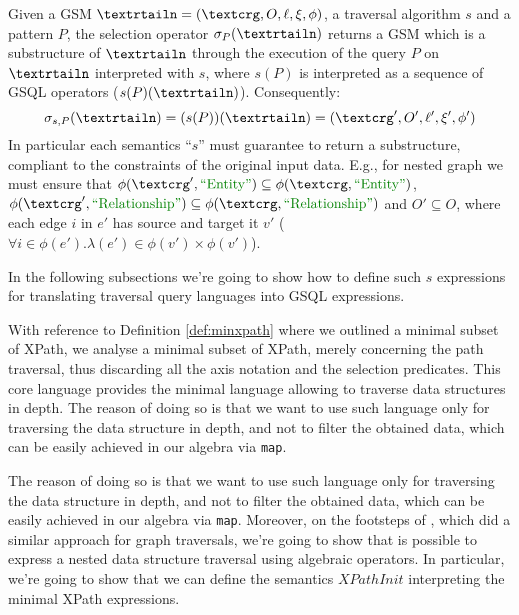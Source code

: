 \begin{definition}[Selection]
	Given a GSM $\fullnested$, a traversal algorithm $s$ and a pattern  $P$, the selection operator $\sigma_P(\nested)$ returns a GSM which is a substructure of $\nested$ through the execution of the query $P$ on $\nested$ interpreted with $s$, where $s(P)$ is interpreted as a sequence of GSQL operators ($s(P)(\nested)$). Consequently:
	\[\sigma_{s,P}(\nested)=(s(P))(\nested)=(\ngraph',O',\ell',\xi',\phi')\]
	In particular each semantics ``$s$'' must guarantee to return a substructure, compliant to the constraints of the original input data. E.g., for nested graph we must ensure that
	$\phi(\ngraph',\ONTA)\subseteq \phi(\ngraph,\ONTA)$, $\phi(\ngraph',\RELA)\subseteq \phi(\ngraph,\RELA)$ and $O'\subseteq O$, where each edge $i$ in $e'$ has source and target it $v'$ ($\forall i\in\phi(e'). \lambda(e')\in\phi(v')\times \phi(v')$).
\end{definition}

In the following subsections we're going to show how to define such $s$ expressions for translating traversal query languages into GSQL expressions.

With reference to Definition \vref{def:minxpath} where we outlined a minimal subset of XPath, 
we analyse a minimal subset of XPath, merely concerning the path traversal, thus discarding all the axis notation and the selection predicates. This core language provides the minimal language allowing to traverse data structures in depth.
The reason of doing so is that we want to use such language only for traversing the data structure in depth, and not to filter the obtained data, which can be easily achieved in our algebra via \texttt{map}. 

The reason of doing so is that we want to use such language only for traversing the data structure in depth, and not to filter the obtained data, which can be easily achieved in our algebra via \texttt{map}. Moreover, on the footsteps of \cite{NautiLOD}, which did a similar approach for graph traversals, we're going to show that is possible to express a nested data structure traversal using algebraic operators. In particular, we're going to show that we can define the semantics $XPathInit$ interpreting the minimal XPath expressions.


